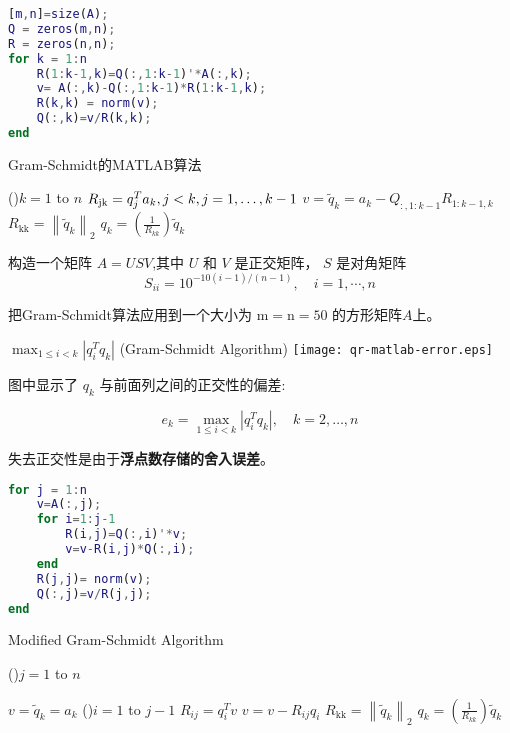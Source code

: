 \begin{example}
    \begin{lstlisting}[caption=Gram Schmidt,language=matlab]
[m,n]=size(A);
Q = zeros(m,n);
R = zeros(n,n);
for k = 1:n
    R(1:k-1,k)=Q(:,1:k-1)'*A(:,k);
    v= A(:,k)-Q(:,1:k-1)*R(1:k-1,k);
    R(k,k) = norm(v);
    Q(:,k)=v/R(k,k);
end
    \end{lstlisting}

    \begin{algorithm}[htbp]
        \caption{Gram-Schmidt的MATLAB算法}
        \For(){$k = 1$ to $n$}{
            $R_{\mathrm{jk}} =q_j^T a_k ,j<k,j=1,\ldotp \ldotp \ldotp ,k-1$\;
            $v={\tilde{q} }_k =a_k -Q_{:,1:k-1} R_{1:k-1,k}$\;
            $R_{\mathrm{kk}} ={\left\|{\tilde{q} }_k \right\|}_2$\;
            $q_k =\left(\frac{1}{R_{kk} }\right){\tilde{q} }_k$\;
        }
    \end{algorithm}

    构造一个矩阵 $ A=U S V $,其中 $ U $ 和 $ V $ 是正交矩阵， $ S $ 是对角矩阵
    $$
    S_{i i}=10^{-10(i-1) /(n-1)}, \quad i=1, \cdots, n
    $$

    把Gram-Schmidt算法应用到一个大小为 $ \mathrm{m}=\mathrm{n}=50 $ 的方形矩阵$A$上。

    \begin{FigureCenter}{$\max _{1 \leq i<k}\left|q_{i}^{T} q_{k}\right|$ (Gram-Schmidt Algorithm)}
        \texttt{[image: qr-matlab-error.eps]}
    \end{FigureCenter}


    图中显示了 $ q_{k} $ 与前面列之间的正交性的偏差:

    $$
    e_{k}=\max _{1 \leq i<k}\left|q_{i}^{T} q_{k}\right|, \quad k=2, \ldots, n
    $$

    失去正交性是由于\textbf{浮点数存储的舍入误差}。

    \begin{lstlisting}[caption=modified Gram-Schmidt,language=matlab]
for j = 1:n
    v=A(:,j);
    for i=1:j-1
        R(i,j)=Q(:,i)'*v;
        v=v-R(i,j)*Q(:,i);
    end
    R(j,j)= norm(v);
    Q(:,j)=v/R(j,j);
end
    \end{lstlisting}

    \begin{algorithm}[htbp]
        \caption{Modified Gram-Schmidt Algorithm}
        \For(){$j=1$ to $n$}{
            $v={\tilde{q} }_k =a_k$\;
            \For(){$i=1$ to $j-1$}{
                $R_{ij} = q_i^T v$\;
                $v = v - R_{ij} q_i$\;
            }
            $R_{\mathrm{kk}} ={\left\|{\tilde{q} }_k \right\|}_2$\;
            $q_k =\left(\frac{1}{R_{kk} }\right){\tilde{q} }_k$\;

}
\end{algorithm}
\end{example}

